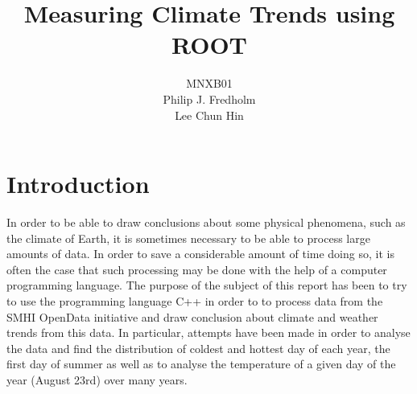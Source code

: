 \documentclass[a4, 12pt]{article}
\title{Measuring Climate Trends using ROOT}
\author{MNXB01 \\ Philip J. Fredholm \\Lee Chun Hin }
\begin{document}
\maketitle
\tableofcontents
\newpage

\section{Introduction}
In order to be able to draw conclusions about some physical phenomena, such as the climate of Earth, it is sometimes necessary to be able to process large amounts of data. In order to save a considerable amount of time doing so, it is often the case that such processing may be done with the help of a computer programming language. The purpose of the subject of this report has been to try to use the programming language C++ in order to to process data from the SMHI OpenData initiative and draw conclusion about climate and weather trends from this data. In particular, attempts have been made in order to analyse the data and find the distribution of coldest and hottest day of each year, the first day of summer as well as to analyse the temperature of a given day of the year (August 23rd) over many years.
\end{document}
